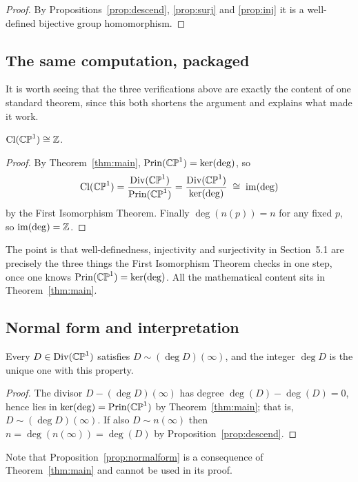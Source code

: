 \begin{proof}
By Propositions~\ref{prop:descend}, \ref{prop:surj} and \ref{prop:inj} it is a
well-defined bijective group homomorphism.
\end{proof}

\subsection{The same computation, packaged}

It is worth seeing that the three verifications above are exactly the content of
one standard theorem, since this both shortens the argument and explains what
made it work.

\begin{smjproposition}
$\operatorname{Cl}(\mathbb{CP}^1) \cong \mathbb{Z}$.
\end{smjproposition}

\begin{proof}
By Theorem~\ref{thm:main}, $\operatorname{Prin}(\mathbb{CP}^1) = \ker(\deg)$, so
\[
\operatorname{Cl}(\mathbb{CP}^1) = \frac{\operatorname{Div}(\mathbb{CP}^1)}{\operatorname{Prin}(\mathbb{CP}^1)} = \frac{\operatorname{Div}(\mathbb{CP}^1)}{\ker(\deg)}
\;\cong\; \operatorname{im}(\deg)
\]
by the First Isomorphism Theorem. Finally $\deg(n(p)) = n$ for any fixed $p$, so
$\operatorname{im}(\deg) = \mathbb{Z}$.
\end{proof}

The point is that well-definedness, injectivity and surjectivity in
Section~5.1 are precisely the three things the First Isomorphism Theorem checks
in one step, once one knows $\operatorname{Prin}(\mathbb{CP}^1) = \ker(\deg)$. All the mathematical
content sits in Theorem~\ref{thm:main}.

\subsection{Normal form and interpretation}

\begin{smjproposition}\label{prop:normalform}
Every $D \in \operatorname{Div}(\mathbb{CP}^1)$ satisfies $D \sim (\deg D)(\infty)$, and the integer
$\deg D$ is the unique one with this property.
\end{smjproposition}

\begin{proof}
The divisor $D - (\deg D)(\infty)$ has degree $\deg(D) - \deg(D) = 0$, hence lies
in $\ker(\deg) = \operatorname{Prin}(\mathbb{CP}^1)$ by Theorem~\ref{thm:main}; that is,
$D \sim (\deg D)(\infty)$. If also $D \sim n(\infty)$ then
$n = \deg(n(\infty)) = \deg(D)$ by Proposition~\ref{prop:descend}.
\end{proof}

\begin{remark}
Note that Proposition~\ref{prop:normalform} is a consequence of
Theorem~\ref{thm:main} and cannot be used in its proof.
\end{remark}

